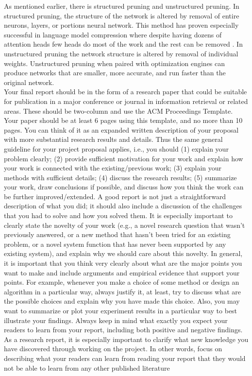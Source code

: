 \documentclass[sigplan,screen]{acmart}
\begin{document}
As mentioned earlier, there is structured pruning and unstructured pruning. In structured pruning, the structure of the network is altered by removal of entire neurons, layers, or portions neural network. This method has proven especially successful in language model compression where despite having dozens of attention heads \cite{Vaswani2017AttentionIA} few heads do most of the work and the rest can be removed \cite{Michel2019AreSH}. In unstructured pruning the network structure is altered by removal of individual weights. Unstructured pruning when paired with optimization engines can produce networks that are smaller, more accurate, and run faster than the original network. \\

Your final report should be in the form of a research paper that could be suitable for publication in a major conference or journal in information retrieval or related areas. These should be two-column and use the ACM Proceedings Template. Your paper should be at least 6 pages using this template, and no more than 10 pages.
You can think of it as an expanded written description of your proposal with more substantial research results and details. Thus the same general guideline for your project proposal applies, i.e., you should (1) explain your problem clearly; (2) provide sufficient motivation for your work and explain how your work is connected with the existing/previous work; (3) explain your methods with sufficient details; (4) discuss the research results; (5) summarize your work, draw conclusions if possible, and discuss how you think the work can be further improved/extended.
A good report is not just a straightforward description of what you did; it should also include a discussion of the challenges that you had to solve and how you solved them. It is especially important to clearly state the novelty of your work (e.g., a novel research question that wasn’t previously answered, or a new method that hasn’t been tried for an existing problem, or a novel system function that has never been supported by any existing system), and explain why we should care about this novelty. In general, it is important that you think very clearly about what are the major points you want to make and include arguments and empirical evidence that support your points. For example, whenever you make a choice of some method or design an algorithm in a particular way, always justify it, at least, try to discuss what are the possible choices and explain why you have made this choice. Also, you may want to summarize or plot your experiment results in a particular way to best illustrate your findings. Always keep in mind what exactly you expect your readers to learn from your report, including both positive and negative findings. As a research report, it is especially important to clarify what new knowledge you have discovered through working on the project. In other words, focus on describing what your readers can learn from reading your report that they would not be able to learn from any other published literature


\end{document}
